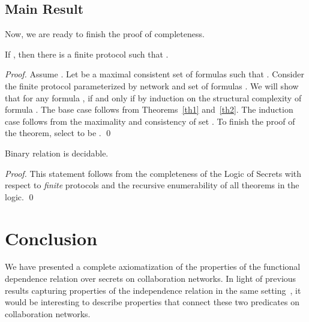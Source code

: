\documentclass{llncs}
\begin{document}
\subsection{Main Result}
Now, we are ready to finish the proof of completeness.

\begin{theorem}\label{}
If , then there is a finite protocol  such that . 
\end{theorem}
\begin{proof}
Assume . Let  be a maximal consistent set of formulas such that . Consider the finite  protocol  parameterized by network  and set of formulas . 
We will show that for any formula ,  if and only if  by induction on the structural complexity
of formula . The base case follows from Theorems~\ref{th1} and~\ref{th2}. The induction case follows from the maximality and consistency of set . To finish the proof of the theorem, select  to be .
\qed \end{proof}

\begin{corollary}\label{}
Binary relation  is decidable.
\end{corollary}

\begin{proof}
This statement follows from the completeness of the Logic of Secrets with respect to {\em finite} protocols and the recursive enumerability of all theorems in the logic. \qed
\end{proof}

\section{Conclusion}

We have presented a complete axiomatization of the properties of the functional dependence relation over secrets on collaboration networks.  In light of previous results capturing properties of the independence relation in the same setting~\cite{mn09a}, it would be interesting to describe properties that connect these two predicates on collaboration networks.  
\end{document}
